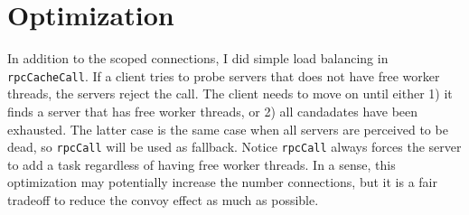 \section{Optimization}
In addition to the scoped connections, I did simple load balancing in {\tt rpcCacheCall}.
If a client tries to probe servers that does not have free worker threads, the servers reject the call.
The client needs to move on until either 1) it finds a server that has free worker threads, or 2) all candadates have been exhausted.
The latter case is the same case when all servers are perceived to be dead, so {\tt rpcCall} will be used as fallback.
Notice {\tt rpcCall} always forces the server to add a task regardless of having free worker threads.
In a sense, this optimization may potentially increase the number connections, but it is a fair tradeoff to reduce the convoy effect as much as possible.
